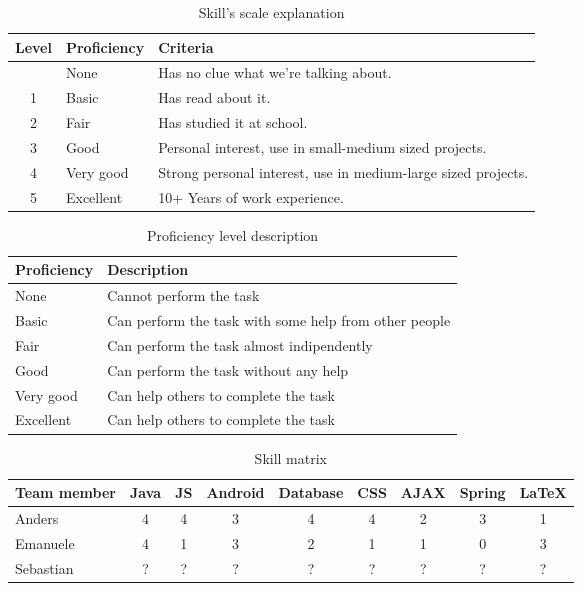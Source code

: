 \begin{table}[h]
\begin{center}
\begin{tabular}{ | c | l | l | }
  \hline
  Level & Proficiency & Criteria \\
  \hline\noalign{\smallskip}\noalign{\smallskip}\hline
  0 & None		& Has no clue what we're talking about. \\
  1 & Basic		& Has read about it.\\
  2 & Fair		& Has studied it at school.\\
  3 & Good		& Personal interest, use in small-medium sized projects.\\
  4 & Very good	& Strong personal interest, use in medium-large sized projects. \\
  5 & Excellent	& 10+ Years of work experience. \\
  \hline
\end{tabular}
\end{center}
\caption{Skill's scale explanation}
\label{table:skillscale}
\end{table}

\begin{table}[h]
\begin{center}
\begin{tabular}{ | l | l | }
  \hline
  Proficiency & Description \\
  \hline\noalign{\smallskip}\noalign{\smallskip}\hline
  None		& Cannot perform the task \\
  Basic		& Can perform the task with some help from other people \\
  Fair		& Can perform the task almost indipendently \\
  Good		& Can perform the task without any help \\
  Very good	& Can help others to complete the task \\
  Excellent	& Can help others to complete the task \\
  \hline
\end{tabular}
\end{center}
\caption{Proficiency level description}
\label{table:proficiency}
\end{table}

\begin{table}[h]
\begin{center}
\begin{tabular}{ | l | c | c | c | c | c | c | c | c | }
  \hline
  Team member & Java & JS & Android & Database & CSS & AJAX & Spring & LaTeX \\
  \hline\noalign{\smallskip}\noalign{\smallskip}\hline
  Anders & 4 & 4 & 3 & 4 & 4 & 2 & 3 & 1 \\
  Emanuele & 4 & 1 & 3 & 2 & 1 & 1 & 0 & 3 \\
  Sebastian & ? & ? & ? & ? & ? & ? & ? & ? \\
  \hline
\end{tabular}
\end{center}
\caption{Skill matrix}
\label{table:skillmatrix}
\end{table}


